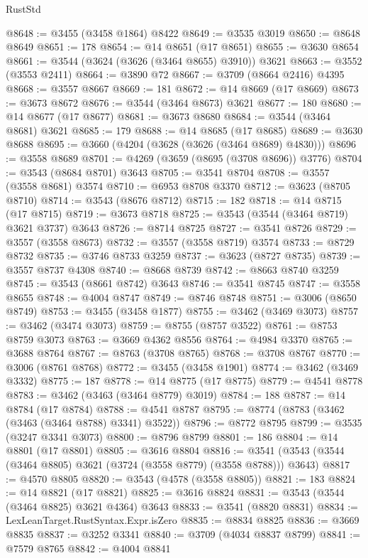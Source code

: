 \begin{lexlean}{RustStd}
\begin{coremodule}
@8648 := @3455 (@3458 @1864) @8422
@8649 := @3535 @3019
@8650 := @8648 @8649
@8651 := 178
@8654 := @14 @8651 (@17 @8651)
@8655 := @3630 @8654
@8661 := @3544 (@3624 (@3626 (@3464 @8655) @3910)) @3621
@8663 := @3552 (@3553 @2411)
@8664 := @3890 @72
@8667 := @3709 (@8664 @2416) @4395
@8668 := @3557 @8667
@8669 := 181
@8672 := @14 @8669 (@17 @8669)
@8673 := @3673 @8672
@8676 := @3544 (@3464 @8673) @3621
@8677 := 180
@8680 := @14 @8677 (@17 @8677)
@8681 := @3673 @8680
@8684 := @3544 (@3464 @8681) @3621
@8685 := 179
@8688 := @14 @8685 (@17 @8685)
@8689 := @3630 @8688
@8695 := @3660 (@4204 (@3628 (@3626 (@3464 @8689) @4830)))
@8696 := @3558 @8689
@8701 := @4269 (@3659 (@8695 (@3708 @8696)) @3776)
@8704 := @3543 (@8684 @8701) @3643
@8705 := @3541 @8704
@8708 := @3557 (@3558 @8681) @3574
@8710 := @6953 @8708 @3370
@8712 := @3623 (@8705 @8710)
@8714 := @3543 (@8676 @8712)
@8715 := 182
@8718 := @14 @8715 (@17 @8715)
@8719 := @3673 @8718
@8725 := @3543 (@3544 (@3464 @8719) @3621 @3737) @3643
@8726 := @8714 @8725
@8727 := @3541 @8726
@8729 := @3557 (@3558 @8673)
@8732 := @3557 (@3558 @8719) @3574
@8733 := @8729 @8732
@8735 := @3746 @8733 @3259
@8737 := @3623 (@8727 @8735)
@8739 := @3557 @8737 @4308
@8740 := @8668 @8739
@8742 := @8663 @8740 @3259
@8745 := @3543 (@8661 @8742) @3643
@8746 := @3541 @8745
@8747 := @3558 @8655
@8748 := @4004 @8747
@8749 := @8746 @8748
@8751 := @3006 (@8650 @8749)
@8753 := @3455 (@3458 @1877)
@8755 := @3462 (@3469 @3073)
@8757 := @3462 (@3474 @3073)
@8759 := @8755 (@8757 @3522)
@8761 := @8753 @8759 @3073
@8763 := @3669 @4362 @8556
@8764 := @4984 @3370
@8765 := @3688 @8764
@8767 := @8763 (@3708 @8765)
@8768 := @3708 @8767
@8770 := @3006 (@8761 @8768)
@8772 := @3455 (@3458 @1901)
@8774 := @3462 (@3469 @3332)
@8775 := 187
@8778 := @14 @8775 (@17 @8775)
@8779 := @4541 @8778
@8783 := @3462 (@3463 (@3464 @8779) @3019)
@8784 := 188
@8787 := @14 @8784 (@17 @8784)
@8788 := @4541 @8787
@8795 := @8774 (@8783 (@3462 (@3463 (@3464 @8788) @3341) @3522))
@8796 := @8772 @8795
@8799 := @3535 (@3247 @3341 @3073)
@8800 := @8796 @8799
@8801 := 186
@8804 := @14 @8801 (@17 @8801)
@8805 := @3616 @8804
@8816 := @3541 (@3543 (@3544 (@3464 @8805) @3621 (@3724 (@3558 @8779) (@3558 @8788))) @3643)
@8817 := @4570 @8805
@8820 := @3543 (@4578 (@3558 @8805))
@8821 := 183
@8824 := @14 @8821 (@17 @8821)
@8825 := @3616 @8824
@8831 := @3543 (@3544 (@3464 @8825) @3621 @4364) @3643
@8833 := @3541 (@8820 @8831)
@8834 := LexLeanTarget.RustSyntax.Expr.isZero
@8835 := @8834 @8825
@8836 := @3669 @8835
@8837 := @3252 @3341
@8840 := @3709 (@4034 @8837 @8799)
@8841 := @7579 @8765
@8842 := @4004 @8841

\end{coremodule}
\end{lexlean}
